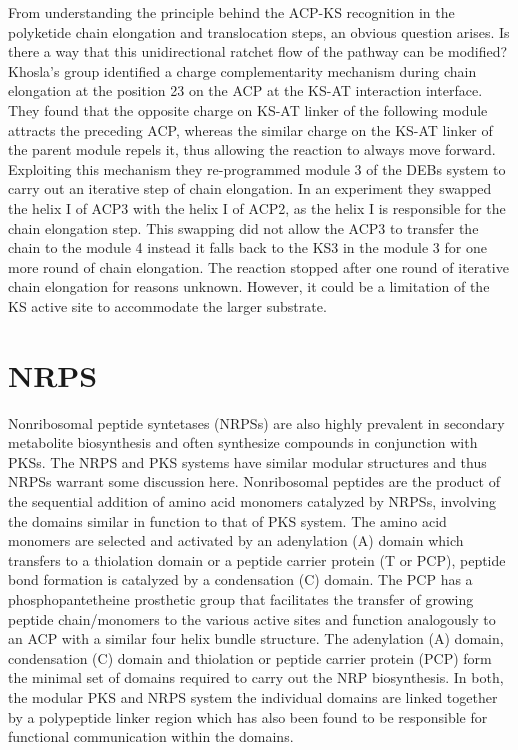 		From understanding the principle behind the ACP-KS recognition in the polyketide chain elongation and translocation steps, an obvious question arises. Is there a way that this unidirectional ratchet flow of the pathway can be modified? Khosla's group identified a charge complementarity mechanism during chain elongation at the position 23 on the ACP at the KS-AT interaction interface. They found that the opposite charge on KS-AT linker of the following module attracts the preceding ACP, whereas the similar charge on the KS-AT linker of the parent module repels it, thus allowing the reaction to always move forward. Exploiting this mechanism they re-programmed module 3 of the DEBs system to carry out an iterative step of chain elongation. In an experiment they swapped the helix I of ACP3 with the helix I of ACP2, as the helix I is responsible for the chain elongation step. This swapping did not allow the ACP3 to transfer the chain to the module 4 instead it falls back to the KS3 in the module 3 for one more round of chain elongation. The reaction stopped after one round of iterative chain elongation for reasons unknown. However, it could be a limitation of the KS active site to accommodate the larger substrate.
		
	\section{NRPS}
	\label{sec:NRPS}
	Nonribosomal peptide syntetases (NRPSs) are also highly prevalent in secondary metabolite biosynthesis and often synthesize compounds in conjunction with PKSs. The NRPS and PKS systems have similar modular structures and thus NRPSs warrant some discussion here. Nonribosomal peptides are the product of the sequential addition of amino acid monomers catalyzed by NRPSs, involving the domains similar in function to that of PKS system. The amino acid monomers are selected and activated by an adenylation (A) domain which transfers to a thiolation domain or a peptide carrier protein (T or PCP), peptide bond formation is catalyzed by a condensation (C) domain. The PCP has a phosphopantetheine prosthetic group that facilitates the transfer of growing peptide chain/monomers to the various active sites and function analogously to an ACP with a similar four helix bundle structure. The adenylation (A) domain, condensation (C) domain and thiolation or peptide carrier protein (PCP) form the minimal set of domains required to carry out the NRP biosynthesis. In both, the modular PKS and NRPS system the individual domains are linked together by a polypeptide linker region which has also been found to be responsible for functional communication within the domains.
	

